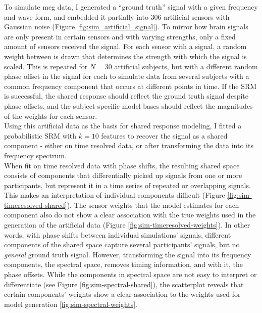 To simulate \gls{meg} data, I generated a ``ground truth'' signal with a given frequency and wave form, and embedded it partially into 306 artificial sensors with Gaussian noise (Figure \ref{fig:sim_artificial_signal}).
To mirror how brain signals are only present in certain sensors and with varying strengths, only a fixed amount of sensors received the signal.
For each sensor with a signal, a random weight between is drawn that determines the strength with which the signal is scaled.
This is repeated for $N = 30$ artificial subjects, but with a different random phase offset in the signal for each to simulate data from several subjects with a common frequency component that occurs at different points in time.
If the \gls{SRM} is successful, the shared response should reflect the ground truth signal despite phase offsets, and the subject-specific model bases should reflect the magnitudes of the weights for each sensor.\\
Using this artificial data as the basis for shared response modeling, I fitted a probabilistic \gls{SRM} with $k=10$ features to recover the signal as a shared component - either on time resolved data, or after transforming the data into its frequency spectrum.\\
When fit on time resolved data with phase shifts, the resulting shared space consists of components that differentially picked up signals from one or more participants, but represent it in a time series of repeated or overlapping signals.
This makes an interpretation of individual components difficult (Figure \ref{fig:sim-timeresolved-shared}).
The sensor weights that the model estimates for each component also do not show a clear association with the true weights used in the generation of the artificial data (Figure \ref{fig:sim-timeresolved-weights}).
In other words, with phase shifts between individual simulations' signals, different components of the shared space capture several participants' signals, but no \textit{general} ground truth signal.
However, transforming the signal into its frequency components, the spectral space, removes timing information, and with it, the phase offsets.
While the components in spectral space are not easy to interpret or differentiate (see Figure \ref{fig:sim-spectral-shared}), the scatterplot reveals that certain components' weights show a clear association to the weights used for model generation \ref{fig:sim-spectral-weights}.
